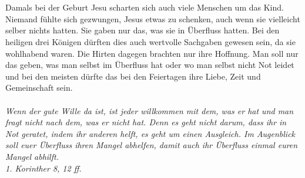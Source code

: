 \\~\\
Damals bei der Geburt Jesu scharten sich auch viele Menschen um das Kind. Niemand fühlte sich gezwungen, Jesus etwas zu schenken, auch wenn sie vielleicht selber nichts hatten. Sie gaben nur das, was sie in Überfluss hatten. Bei den heiligen drei Königen dürften dies auch wertvolle Sachgaben gewesen sein, da sie wohlhabend waren. Die Hirten dagegen brachten nur ihre Hoffnung. Man soll nur das geben, was man selbst im Überfluss hat oder wo man selbst nicht Not leidet und bei den meisten dürfte das bei den Feiertagen ihre Liebe, Zeit und Gemeinschaft sein. 
\\~\\
\textit{Wenn der gute Wille da ist, ist jeder willkommen mit dem, was er hat und man fragt nicht nach dem, was er nicht hat. Denn es geht nicht darum, dass ihr in Not geratet, indem ihr anderen helft, es geht um einen Ausgleich. Im Augenblick soll euer Überfluss ihren Mangel abhelfen, damit auch ihr Überfluss einmal euren Mangel abhilft.\\ 1. Korinther 8, 12 ff.}

